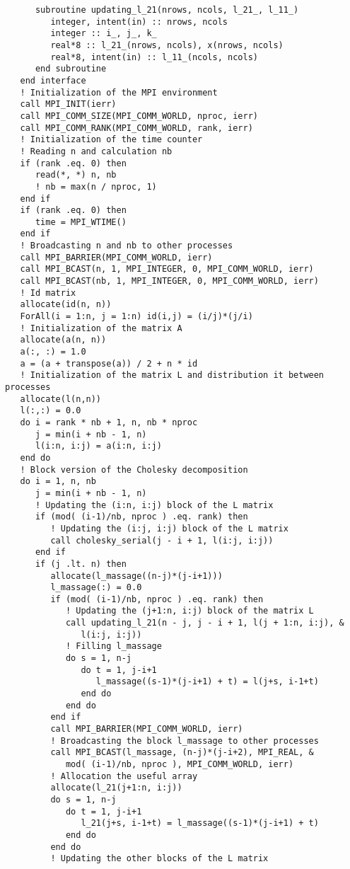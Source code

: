 \begin{lstlisting}
      subroutine updating_l_21(nrows, ncols, l_21_, l_11_)
         integer, intent(in) :: nrows, ncols
         integer :: i_, j_, k_
         real*8 :: l_21_(nrows, ncols), x(nrows, ncols)
         real*8, intent(in) :: l_11_(ncols, ncols)
      end subroutine
   end interface
   ! Initialization of the MPI environment
   call MPI_INIT(ierr)
   call MPI_COMM_SIZE(MPI_COMM_WORLD, nproc, ierr)
   call MPI_COMM_RANK(MPI_COMM_WORLD, rank, ierr)
   ! Initialization of the time counter
   ! Reading n and calculation nb
   if (rank .eq. 0) then
      read(*, *) n, nb
      ! nb = max(n / nproc, 1)
   end if
   if (rank .eq. 0) then
      time = MPI_WTIME()
   end if
   ! Broadcasting n and nb to other processes
   call MPI_BARRIER(MPI_COMM_WORLD, ierr)
   call MPI_BCAST(n, 1, MPI_INTEGER, 0, MPI_COMM_WORLD, ierr)
   call MPI_BCAST(nb, 1, MPI_INTEGER, 0, MPI_COMM_WORLD, ierr)
   ! Id matrix
   allocate(id(n, n))
   ForAll(i = 1:n, j = 1:n) id(i,j) = (i/j)*(j/i)
   ! Initialization of the matrix A
   allocate(a(n, n))
   a(:, :) = 1.0
   a = (a + transpose(a)) / 2 + n * id
   ! Initialization of the matrix L and distribution it between processes
   allocate(l(n,n))
   l(:,:) = 0.0
   do i = rank * nb + 1, n, nb * nproc
      j = min(i + nb - 1, n)
      l(i:n, i:j) = a(i:n, i:j)
   end do
   ! Block version of the Cholesky decomposition
   do i = 1, n, nb
      j = min(i + nb - 1, n)
      ! Updating the (i:n, i:j) block of the L matrix
      if (mod( (i-1)/nb, nproc ) .eq. rank) then
         ! Updating the (i:j, i:j) block of the L matrix
         call cholesky_serial(j - i + 1, l(i:j, i:j))
      end if
      if (j .lt. n) then
         allocate(l_massage((n-j)*(j-i+1)))
         l_massage(:) = 0.0
         if (mod( (i-1)/nb, nproc ) .eq. rank) then
            ! Updating the (j+1:n, i:j) block of the matrix L
            call updating_l_21(n - j, j - i + 1, l(j + 1:n, i:j), &
               l(i:j, i:j))
            ! Filling l_massage
            do s = 1, n-j
               do t = 1, j-i+1
                  l_massage((s-1)*(j-i+1) + t) = l(j+s, i-1+t)
               end do
            end do
         end if
         call MPI_BARRIER(MPI_COMM_WORLD, ierr)
         ! Broadcasting the block l_massage to other processes
         call MPI_BCAST(l_massage, (n-j)*(j-i+2), MPI_REAL, &
            mod( (i-1)/nb, nproc ), MPI_COMM_WORLD, ierr)
         ! Allocation the useful array
         allocate(l_21(j+1:n, i:j))
         do s = 1, n-j
            do t = 1, j-i+1
               l_21(j+s, i-1+t) = l_massage((s-1)*(j-i+1) + t)
            end do
         end do
         ! Updating the other blocks of the L matrix

\end{lstlisting}
